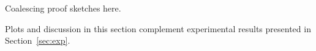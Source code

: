 \appendix \label{sec:app1}

Coalescing proof sketches here.

\appendix \label{sec:app2}

Plots and discussion in this section complement experimental results
presented in Section~\ref{sec:exp}.

